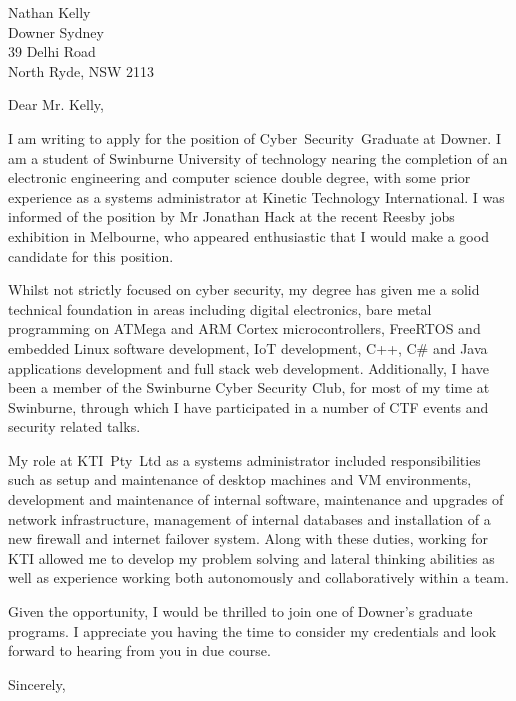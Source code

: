 \documentclass[
    backaddress=false,
    foldmarks=false,
    fromalign=right,
    fromrule,
    fromphone,
    fromemail,
    parskip=half,
    refline=nodate
]{scrlttr2}
\begin{document}
    


    \renewcommand*\raggedsignature{\raggedright}

    \begin{letter}{%
        Nathan Kelly         \\
        Downer Sydney        \\
        39 Delhi Road        \\
        North Ryde, NSW 2113}
        \opening{Dear Mr. Kelly,}
        \raggedbottom
        I am writing to apply for the position of Cyber~Security~Graduate at Downer. I am a student of Swinburne University of technology nearing the completion of an electronic engineering and computer science double degree, with some prior experience as a systems administrator at Kinetic Technology International. I was informed of the position by Mr Jonathan Hack at the recent Reesby jobs exhibition in Melbourne, who appeared enthusiastic that I would make a good candidate for this position.

        Whilst not strictly focused on cyber security, my degree has given me a solid technical foundation in areas including digital electronics, bare metal programming on ATMega and ARM Cortex microcontrollers, FreeRTOS and embedded Linux software development, IoT development, C++, C\# and Java applications development and full stack web development. Additionally, I have been a member of the Swinburne Cyber Security Club, for most of my time at Swinburne, through which I have participated in a number of CTF events and security related talks.
        
        My role at KTI~Pty~Ltd as a systems administrator included responsibilities such as setup and maintenance of desktop machines and VM environments, development and maintenance of internal software, maintenance and upgrades of network infrastructure, management of internal databases and installation of a new firewall and internet failover system. Along with these duties, working for KTI allowed me to develop my problem solving and lateral thinking abilities as well as experience working both autonomously and collaboratively within a team.

        Given the opportunity, I would be thrilled to join one of Downer's graduate programs. I appreciate you having the time to consider my credentials and look forward to hearing from you in due course.

        \closing{Sincerely,}
    \end{letter}
\end{document}
